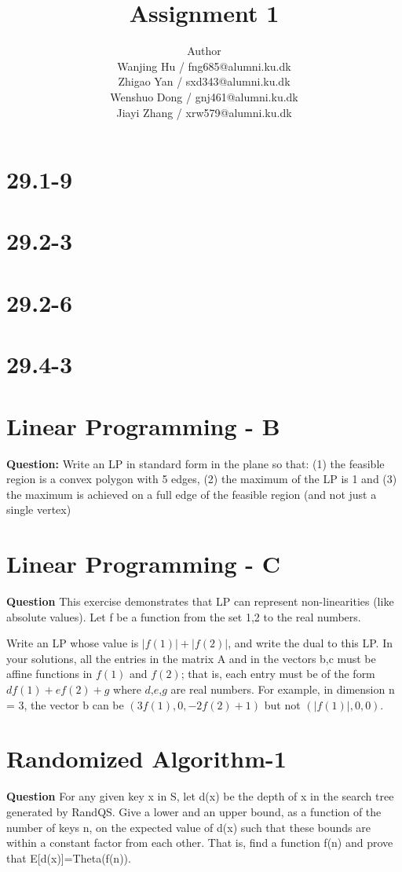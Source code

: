 \documentclass[12pt]{article}
\title{Assignment 1}
\author{Author \\
  Wanjing Hu / fng685@alumni.ku.dk  \\
  Zhigao Yan / sxd343@alumni.ku.dk  \\
  Wenshuo Dong / gnj461@alumni.ku.dk  \\
  Jiayi Zhang / xrw579@alumni.ku.dk \\
}
\begin{document}
\maketitle

\section{29.1-9}

\section{29.2-3}

\section{29.2-6}


\section{29.4-3}

\section{Linear Programming - B}
\textbf{Question:}
Write an LP in standard form in the plane so that: (1) the feasible region is a convex polygon with 5 edges, (2) the maximum of the LP is 1 and (3) the maximum is achieved on a full edge of the feasible region (and not just a single vertex)

\section{Linear Programming - C}
\textbf{Question}
This exercise demonstrates that LP can represent non-linearities (like absolute values). Let f be a function from the set {1,2} to the real numbers. 

Write an LP whose value is $|f(1)|+|f(2)|$, and write the dual to this LP. In your solutions, all the entries in the matrix A and in the vectors b,c must be affine functions in $f(1)$ and $f(2)$; that is, each entry must be of the form $d f(1) + e f(2) + g$ where $d$,$e$,$g$ are real numbers. For example, in dimension n = 3, the vector b can be $(3 f(1), 0, -2f(2)+1)$ but not $(|f(1)|,0,0)$. 


\section{Randomized Algorithm-1}
\textbf{Question}
For any given key x in S, let d(x) be the depth of x in the search tree generated by RandQS. Give a lower and an upper bound, as a function of the number of keys n, on the expected value of d(x) such that these bounds are within a constant factor from each other. That is, find a function f(n) and prove that E[d(x)]=Theta(f(n)).
\end{document}
